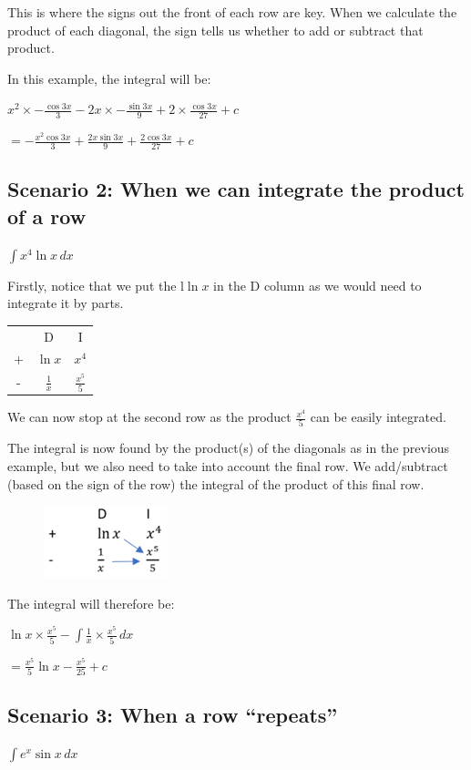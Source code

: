 \documentclass[../main.tex]{subfiles}
\begin{document}
This is where the signs out the front of each row are key. When we calculate the product of each diagonal, the sign tells us whether to add or subtract that product.

In this example, the integral will be:

\(x^2 \times -\frac{\cos{3x}}{3}-2x\times -\frac{\sin{3x}}{9}+2\times \frac{\cos{3x}}{27}+c\)

\(=-\frac{x^2\cos{3x}}{3}+\frac{2x\sin{3x}}{9}+\frac{2\cos{3x}}{27}+c\)

\subsection*{Scenario 2: When we can integrate the product of a row}
\(\int x^4 \ln{x}\, dx\)

Firstly, notice that we put the l\(\ln{x}\) in the D column as we would need to integrate it by parts.

\begin{tabular}{ c c c }
   & D & I \\ 
 +  & $\ln{x}$ &$x^4$ \\  
 - & $\frac{1}{x}$ & $\frac{x^5}{5}$\\
\end{tabular}

We can now stop at the second row as the product \(\frac{x^4}{5}\) can be easily integrated. 

The integral is now found by the product(s) of the diagonals as in the previous example, but we also need to take into account the final row. We add/subtract (based on the sign of the row) the integral of the product of this final row.
\begin{figure}[h]
    \includegraphics{images/dimethod2.png}
\end{figure}

The integral will therefore be:

\(\ln{x} \times \frac{x^5}{5}-\int \frac{1}{x}\times \frac{x^5}{5}\, dx\)

\(=\frac{x^5}{5}\ln{x}-\frac{x^5}{25}+c\)

\subsection*{Scenario 3: When a row “repeats”}
\(\int e^x \sin{x}\,dx\)
\end{document}
